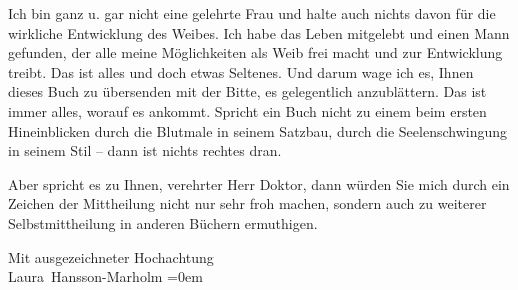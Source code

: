 \pstart
           Ich bin ganz u. gar nicht eine gelehrte Frau und halte auch nichts davon für die
               wirkliche Entwicklung des Weibes. Ich habe das Leben mitgelebt und einen Mann gefunden, der alle meine
               Möglichkeiten als Weib frei macht und zur Entwicklung treibt. Das ist alles und doch
               etwas Seltenes. Und darum wage ich es, Ihnen dieses Buch zu übersenden mit der Bitte, es gelegentlich
               anzublättern. Das ist immer alles, worauf es ankommt. Spricht ein Buch nicht zu einem
               beim ersten Hineinblicken durch die Blutmale in seinem Satzbau, durch die
               Seelenschwingung in seinem Stil – dann ist nichts rechtes dran.\pend
           
\pstart
           Aber spricht es zu Ihnen, verehrter Herr Doktor, dann würden Sie mich durch ein
               Zeichen der Mittheilung nicht nur sehr froh machen, sondern auch zu weiterer
               Selbstmittheilung in anderen Büchern ermuthigen.\pend
           
\pstart
           Mit ausgezeichneter Hochachtung{\\[\baselineskip]}\spacefill\mbox{Laura Hansson-Marholm}\pend
           \leftskip=0em{}\endnumbering{}  
      